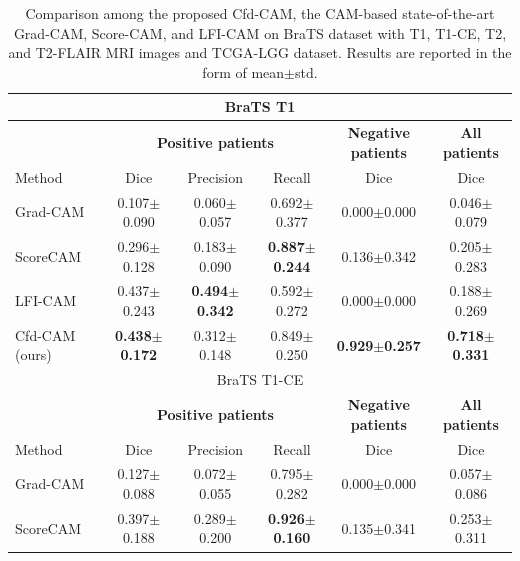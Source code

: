 \begin{table}[t]
\centering
\caption{Comparison among the proposed Cfd-CAM, the CAM-based state-of-the-art Grad-CAM\cite{selvaraju2017grad}, Score-CAM\cite{wang2020score}, and LFI-CAM\cite{lee2021lfi} on BraTS dataset with T1, T1-CE, T2, and T2-FLAIR MRI images and TCGA-LGG dataset. Results are reported in the form of mean$\pm$std.}
\label{Table:Compare_Exp_CAM}
\begin{tabular}{l|c|c|c|c|c}
\hline
\multicolumn{6}{c}{BraTS T1} \\ \hline
{\textbf{}}        & \multicolumn{3}{c|}{\textbf{Positive patients}} & \textbf{Negative patients} & \textbf{All patients} \\ \hline
Method           & Dice                  & Precision             & Recall                & Dice                       & Dice             \\ \hline
Grad-CAM\cite{selvaraju2017grad}        & 0.107$\pm$0.090          & 0.060$\pm$0.057          & 0.692$\pm$0.377          & 0.000$\pm$0.000               & 0.046$\pm$0.079          \\ \hline
ScoreCAM\cite{wang2020score}        & 0.296$\pm$0.128          & 0.183$\pm$0.090          & \textbf{0.887$\pm$0.244}          & 0.136$\pm$0.342               & 0.205$\pm$0.283          \\ \hline
LFI-CAM\cite{lee2021lfi}         & 0.437$\pm$0.243          & \textbf{0.494$\pm$0.342}          & 0.592$\pm$0.272          & 0.000$\pm$0.000               & 0.188$\pm$0.269          \\ \hline
Cfd-CAM (ours)   & \textbf{0.438$\pm$0.172} & 0.312$\pm$0.148 & 0.849$\pm$0.250 & \textbf{0.929$\pm$0.257}      & \textbf{0.718$\pm$0.331} \\ \hline \hline
\multicolumn{6}{c}{BraTS T1-CE} \\ \hline
{\textbf{}}        & \multicolumn{3}{c|}{\textbf{Positive patients}} & \textbf{Negative patients} & \textbf{All patients} \\ \hline
Method           & Dice                  & Precision             & Recall                & Dice                       & Dice             \\ \hline
Grad-CAM\cite{selvaraju2017grad}        & 0.127$\pm$0.088          & 0.072$\pm$0.055          & 0.795$\pm$0.282          & 0.000$\pm$0.000               & 0.057$\pm$0.086          \\ \hline
ScoreCAM\cite{wang2020score}        & 0.397$\pm$0.188          & 0.289$\pm$0.200          & \textbf{0.926$\pm$0.160}          & 0.135$\pm$0.341               & 0.253$\pm$0.311          \\ \hline

\end{tabular}
\end{table}
